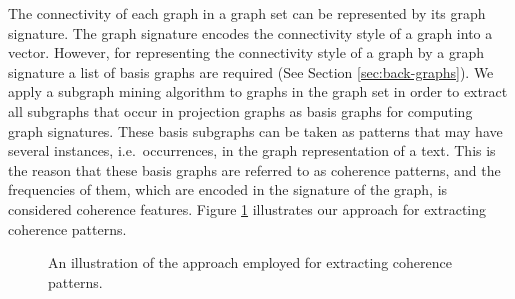 The connectivity of each graph in a graph set can be represented by its graph signature.
The graph signature encodes the connectivity style of a graph into a vector. 
However, for representing the connectivity style of a graph by a graph signature a list of basis graphs are required (See Section \ref{sec:back-graphs}).  
We apply a subgraph mining algorithm to graphs in the graph set in order to extract all subgraphs that occur in projection graphs as basis graphs for computing graph signatures. 
These basis subgraphs can be taken as patterns that may have several instances, i.e.\ occurrences, in the graph representation of a text.  
This is the reason that these basis graphs are referred to as coherence patterns, and the frequencies of them, which are encoded in the signature of the graph, is considered coherence features. 
Figure \ref{fig:pattern-extraction} illustrates our approach for extracting coherence patterns.

\begin{figure}[!ht]
	\begin{center}
	\end{center}
	\caption{An illustration of the approach employed for extracting coherence patterns.}
	\label{fig:pattern-extraction}
\end{figure}


